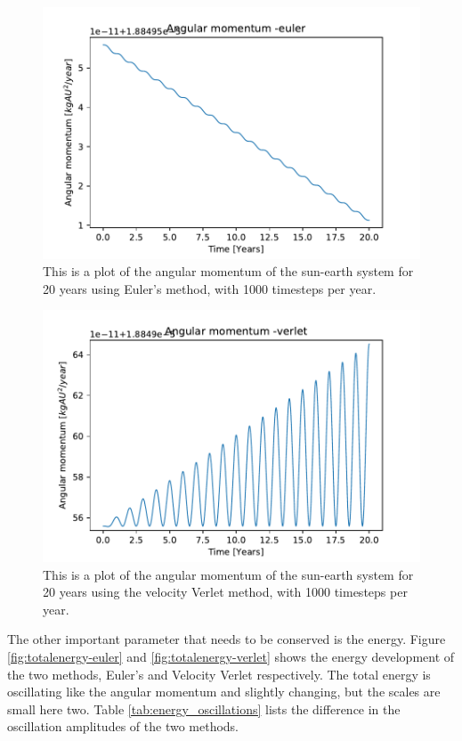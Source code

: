 \begin{figure}[H]
\includegraphics[width=0.9\linewidth]{../results/plots/angularmomentum-euler.pdf}\caption{This is a plot of the angular momentum of the sun-earth system for 20 years using Euler's method, with 1000 timesteps per year.}\label{fig:angluarmomentum-euler}
\end{figure}	

\begin{figure}[H]
\includegraphics[width=0.9\linewidth]{../results/plots/angularmomentum-verlet.pdf}\caption{This is a plot of the angular momentum of the sun-earth system for 20 years using the velocity Verlet method, with 1000 timesteps per year.}\label{fig:angularmomentum-verlet}
\end{figure}	

The other important parameter that needs to be conserved is the energy. Figure \ref{fig:totalenergy-euler} and \ref{fig:totalenergy-verlet} shows the energy development of the two methods, Euler's and Velocity Verlet respectively. The total energy is oscillating like the angular momentum and slightly changing, but the scales are small here two. Table \ref{tab:energy_oscillations} lists the difference in the oscillation amplitudes of the two methods. 

